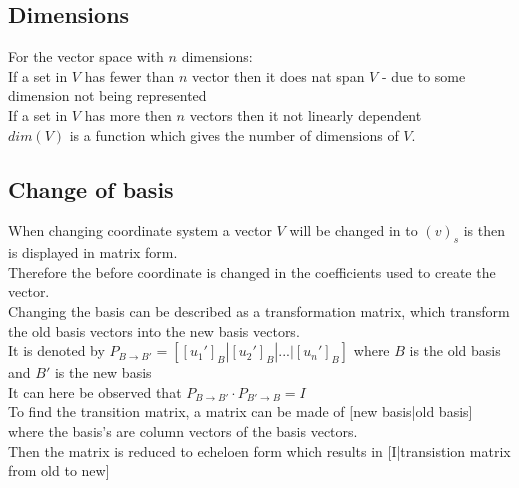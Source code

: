 \documentclass[12pt, a4paper]{article}
\begin{document}
		\subsection{Dimensions}
			For the vector space with $n$ dimensions:\\
			If a set in $V$ has fewer than $n$ vector then it does nat span $V$ - due to some dimension not being represented\\
			If a set in $V$ has more then $n$ vectors then it not linearly dependent \\
			$dim(V)$ is a function which gives the number of dimensions of $V$.\\
		\subsection{Change of basis}
			When changing coordinate system a vector $V$ will be changed in to $(v)_s$ is then is displayed in matrix form.\\
			Therefore the before coordinate is changed in the coefficients used to create the vector.\\
			Changing the basis can be described as a transformation matrix, which transform the old basis vectors into the new basis vectors.\\
			It is denoted by $P_{B\rightarrow B'}=[[u_1']_B|[u_2']_B|...|[u_n']_B]$ where $B$ is the old basis and $B'$ is the new basis\\
			It can here be observed that $P_{B\rightarrow B'}\cdot P_{B'\rightarrow B}=I$\\
			To find the transition matrix, a matrix can be made of [new basis|old basis] where the basis's are column vectors of the basis vectors.\\
			Then the matrix is reduced to echeloen form which results in [I|transistion matrix from old to new]
			
			 
			
			
			
			
				
\end{document}
